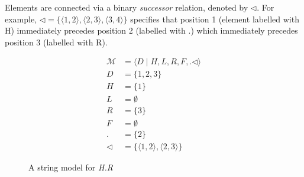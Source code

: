 Elements are connected via a binary \textit{successor} relation, denoted 
by $\lhd$.  For example, $\lhd = \{\langle 1, 2\rangle, \langle 2,
3\rangle, \langle 3, 4\rangle\}$ specifies that position 1 (element labelled with H) immediately precedes position 2 (labelled with $.$) which
immediately precedes position 3 (labelled with R).

\begin{figure}
    \centering  
    \begin{minipage}{.45\textwidth}
        \centering

        
    \end{minipage}
    \hfill
    \begin{minipage}{0.50\textwidth}
        \small

        \[
        \begin{aligned}
            \mathcal{M} &= \langle D \mid H,L,R,F, . \lhd\rangle \\[2pt]
            D           &= \{1,2,3\} \\
            H           &= \{1\} \\
            L           &= \emptyset \\
            R           &= \{3\}\\
            F           &= \emptyset \\
            .           &= \{2\} \\
            \lhd        &= \{
                \langle1,2\rangle,
                \langle2,3\rangle
            \}
        \end{aligned}
        \]

    \end{minipage}

    \caption{A string model for \textit{H.R}}

    \label{fig:model:str-HR}
\end{figure}

